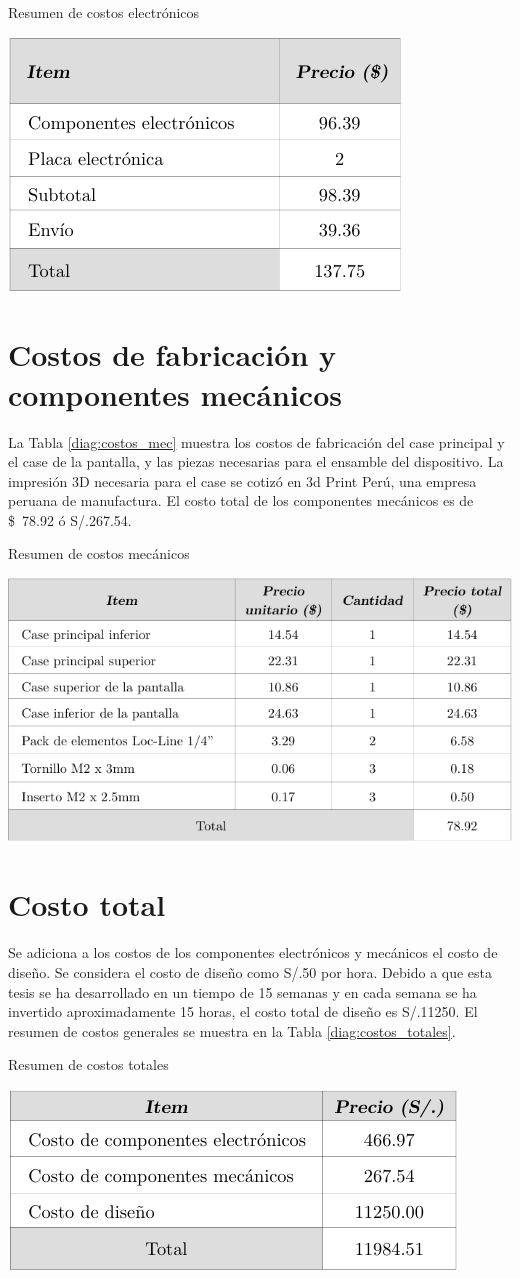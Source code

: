 \begin{table}[htb!]
  \caption{Resumen de costos electrónicos}
  \label{diag:costos_elec}
  \centering
  \includegraphics[width=0.55\linewidth]{costos_elec.pdf}
\end{table}


\section{Costos de fabricación y componentes mecánicos}
La Tabla \ref{diag:costos_mec} muestra los costos de fabricación del case principal y el case de la pantalla, y las piezas necesarias para el ensamble del dispositivo. La impresión 3D necesaria para el case se cotizó en 3d Print Perú, una empresa peruana de manufactura. El costo total de los componentes mecánicos es de \SI{78.92}[\$]{} ó S/.267.54.

\begin{table}[htb!]
  \caption{Resumen de costos mecánicos}
  \label{diag:costos_mec}
  \centering
  \includegraphics[width=0.9\linewidth]{costos_mec.pdf}
\end{table}

\section{Costo total}
Se adiciona a los costos de los componentes electrónicos y mecánicos el costo de diseño. Se considera el costo de diseño como S/.50 por hora. Debido a que esta tesis se ha desarrollado en un tiempo de 15 semanas y en cada semana se ha invertido aproximadamente 15 horas, el costo total de diseño es S/.11250. El resumen de costos generales se muestra en la Tabla \ref{diag:costos_totales}.

\begin{table}[H]
  \caption{Resumen de costos totales}
  \label{diag:costos_totales}
  \centering
  \includegraphics[width=0.6\linewidth]{costos_totales.pdf}
\end{table}
